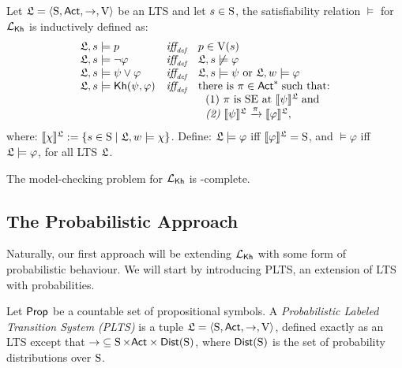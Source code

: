 \begin{definition} \label{def:semantics-kh}
    Let $\model = \tup{\S,\ACT,\ra,\V}$ be an LTS and let $s\in\S$, the satisfiability relation $\models$ for $\Khlogic$ is inductively defined as:
    \[
    \begin{array}{l@{\ \ \ }c@{\ \ \  }l}
    \model, s \models p & \iffdef & p \in \V(s) \\
    \model, s\models \neg\varphi & \iffdef & \model, s \not\models \varphi \\
    \model, s \models \psi\vee\varphi & \iffdef & \model, s \models \psi \mbox{ or }\model, w \models \varphi \\
    \model, s \models \kh(\psi,\varphi) & \iffdef & \text{there is } \plan \in \ACT^* \;\text{such that:} \\
    & & \ \ \text{\rm (1)} \ \plan \text{ is SE at }  \truthset{\model}{\psi}\; \text{and} \\
    & & \ \ \text{\em (2)} \ \truthset{\model}{\psi} \reach{\plan} \truthset{\model}{\varphi}, 
    \end{array}
    \]      where: $\truthset{\model}{\chi} := \csetsc{s\in\S}{\model,w\models\chi}$. Define: $\model\models\varphi$ iff  $\truthset{\model}{\varphi}=\S$, and $\models\varphi$ iff $\model\models\varphi$, for all LTS $\model$.
\end{definition}

\begin{proposition}
    The model-checking problem for $\Khlogic$ is \PSPACE-complete.
\end{proposition}

\subsection{The Probabilistic Approach}

Naturally, our first approach will be extending $\Khlogic$ with some form of probabilistic behaviour. We will start by introducing PLTS, an extension of LTS with probabilities.

\begin{definition}\label{def:plts}
    Let $\PROP$ be a countable set of propositional symbols. 
    A \emph{Probabilistic Labeled Transition System (PLTS)}  is a tuple
    $\model=\tup{\S,\ACT,\ra,\V}$, defined exactly as an LTS except that ${\ra}\subseteq \S \times \ACT \times \dist(\S)$, where  $\dist(\S)$ is the set of probability distributions over $\S$.
\end{definition}

